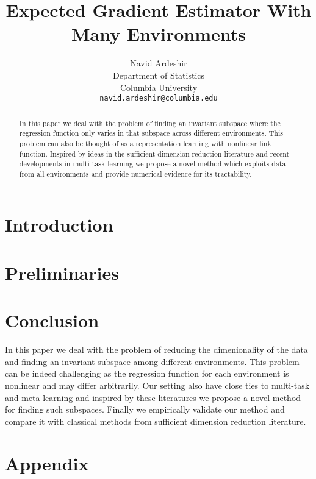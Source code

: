 \documentclass{article}
\title{Expected Gradient Estimator With Many Environments}
\author{%
  Navid Ardeshir \\
  Department of Statistics\\
  Columbia University \\
  \texttt{navid.ardeshir@columbia.edu} \\
}
\begin{document}
\maketitle


\begin{abstract}
    In this paper we deal with the problem of finding an invariant subspace where the regression function only varies in that subspace across different environments.
    This problem can also be thought of as a representation learning with nonlinear link function.
    Inspired by ideas in the sufficient dimension reduction literature \citep{li2018sufficient} and recent developments in multi-task learning \citep{boursier2022trace} we propose a novel method which exploits data from all environments and provide numerical evidence for its tractability. 
\end{abstract}

\section{Introduction}


\section{Preliminaries}


% 



\section{Conclusion}
In this paper we deal with the problem of reducing the dimenionality of the data and finding an invariant subspace among different environments.
This problem can be indeed challenging as the regression function for each environment is nonlinear and may differ arbitrarily. 
Our setting also have close ties to multi-task and meta learning and inspired by these literatures we propose a novel method for finding such subspaces. 
Finally we empirically validate our method and compare it with classical methods from sufficient dimension reduction literature.






\section{Appendix}

\end{document}
